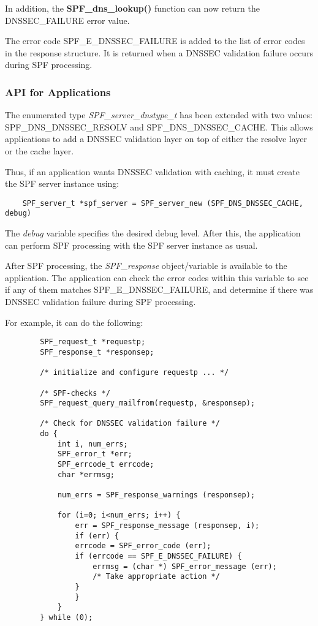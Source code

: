 \documentclass[12pt]{article}
\newcommand{\func}[1]{{\bf #1}}
\newcommand{\var}[1]{{\em #1}}
\begin{document}
In addition, the \func{SPF\_dns\_lookup()} function can now return
the DNS\-SEC\_\-FAILURE error value.

The error code SPF\_E\_DNSSEC\_FAILURE is added to the list of error codes
in the response structure.  It is returned when a DNSSEC validation failure
occurs during SPF processing.


\subsubsection{API for Applications}

The enumerated type {\it SPF\_server\_dnstype\_t} has been extended with two
values:  SPF\_\-DNS\_\-DNS\-SEC\_\-RESOLV and SPF\_\-DNS\_\-DNS\-SEC\_\-CACHE.
This allows applications to add a DNSSEC validation layer on top of either
the resolve layer or the cache layer.

Thus, if an application wants DNSSEC validation with caching, it must create
the SPF server instance using:

\begin{verbatim}
    SPF_server_t *spf_server = SPF_server_new (SPF_DNS_DNSSEC_CACHE, debug)
\end{verbatim}

The \var{debug} variable specifies the desired debug level.  After this, the
application can perform SPF processing with the SPF server instance as usual.

After SPF processing, the \var{SPF\_response} object/variable is available
to the application.  The application can check the error codes within this
variable to see if any of them matches SPF\_\-E\_\-DNS\-SEC\_\-FAILURE, and
determine if there was DNSSEC validation failure during SPF processing.

For example, it can do the following:

\begin{verbatim}
        SPF_request_t *requestp;
        SPF_response_t *responsep;

        /* initialize and configure requestp ... */

        /* SPF-checks */
        SPF_request_query_mailfrom(requestp, &responsep);

        /* Check for DNSSEC validation failure */
        do {
            int i, num_errs;
            SPF_error_t *err;
            SPF_errcode_t errcode;
            char *errmsg;

            num_errs = SPF_response_warnings (responsep);

            for (i=0; i<num_errs; i++) {
                err = SPF_response_message (responsep, i);
                if (err) {
        	    errcode = SPF_error_code (err);
        	    if (errcode == SPF_E_DNSSEC_FAILURE) {
        	        errmsg = (char *) SPF_error_message (err);
        	        /* Take appropriate action */
        	    }
                }
            }
        } while (0);
\end{verbatim}
\end{document}

